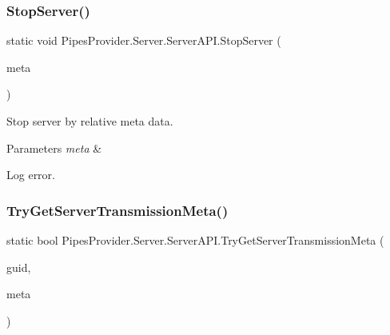\subsubsection{\texorpdfstring{Stop\+Server()}{StopServer()}\hspace{0.1cm}{\footnotesize\ttfamily [2/2]}}
{\footnotesize\ttfamily static void Pipes\+Provider.\+Server.\+Server\+A\+P\+I.\+Stop\+Server (\begin{DoxyParamCaption}\item[{\mbox{\hyperlink{class_pipes_provider_1_1_server_1_1_server_transmission_controller}{Server\+Transmission\+Controller}}}]{meta }\end{DoxyParamCaption})\hspace{0.3cm}{\ttfamily [static]}}



Stop server by relative meta data. 


\begin{DoxyParams}{Parameters}
{\em meta} & \\
\hline
\end{DoxyParams}
Log error. \mbox{\label{class_pipes_provider_1_1_server_1_1_server_a_p_i_aa6e5aaed8ff095caa67db23104e5da7a}} 
\subsubsection{\texorpdfstring{Try\+Get\+Server\+Transmission\+Meta()}{TryGetServerTransmissionMeta()}}
{\footnotesize\ttfamily static bool Pipes\+Provider.\+Server.\+Server\+A\+P\+I.\+Try\+Get\+Server\+Transmission\+Meta (\begin{DoxyParamCaption}\item[{string}]{guid,  }\item[{out \mbox{\hyperlink{class_pipes_provider_1_1_server_1_1_server_transmission_controller}{Server\+Transmission\+Controller}}}]{meta }\end{DoxyParamCaption})\hspace{0.3cm}{\ttfamily [static]}}



